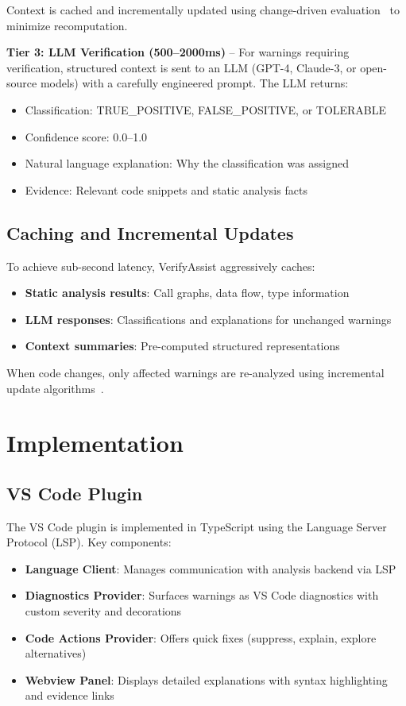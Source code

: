 \documentclass[conference]{IEEEtran}
\begin{document}
Context is cached and incrementally updated using change-driven evaluation~\cite{hedin2012intraJ} to minimize recomputation.

\textbf{Tier 3: LLM Verification (500--2000ms)} -- For warnings requiring verification, structured context is sent to an LLM (GPT-4, Claude-3, or open-source models) with a carefully engineered prompt. The LLM returns:
\begin{itemize}
\item Classification: TRUE\_POSITIVE, FALSE\_POSITIVE, or TOLERABLE
\item Confidence score: 0.0--1.0
\item Natural language explanation: Why the classification was assigned
\item Evidence: Relevant code snippets and static analysis facts
\end{itemize}

\subsection{Caching and Incremental Updates}

To achieve sub-second latency, VerifyAssist aggressively caches:
\begin{itemize}
\item \textbf{Static analysis results}: Call graphs, data flow, type information
\item \textbf{LLM responses}: Classifications and explanations for unchanged warnings
\item \textbf{Context summaries}: Pre-computed structured representations
\end{itemize}

When code changes, only affected warnings are re-analyzed using incremental update algorithms~\cite{sanchez2021verifly}.

\section{Implementation}

\subsection{VS Code Plugin}

The VS Code plugin is implemented in TypeScript using the Language Server Protocol (LSP). Key components:

\begin{itemize}
\item \textbf{Language Client}: Manages communication with analysis backend via LSP
\item \textbf{Diagnostics Provider}: Surfaces warnings as VS Code diagnostics with custom severity and decorations
\item \textbf{Code Actions Provider}: Offers quick fixes (suppress, explain, explore alternatives)
\item \textbf{Webview Panel}: Displays detailed explanations with syntax highlighting and evidence links
\end{itemize}
\end{document}
